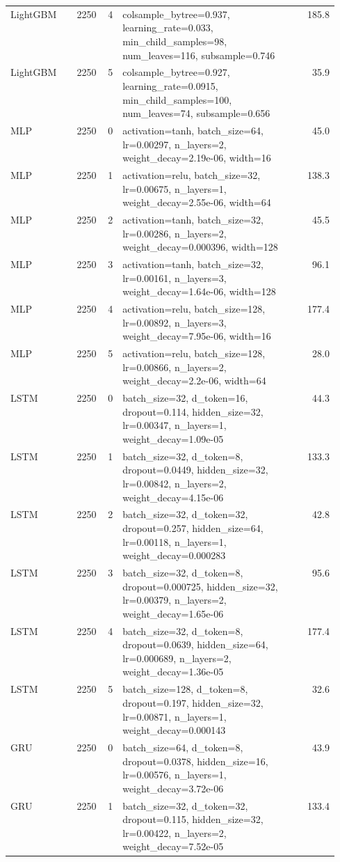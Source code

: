 \begin{longtable}{lrrp{0.55\linewidth}r}
LightGBM & 2250 & 4 & colsample\_bytree=0.937, learning\_rate=0.033, min\_child\_samples=98, num\_leaves=116, subsample=0.746 & 185.8 \\
LightGBM & 2250 & 5 & colsample\_bytree=0.927, learning\_rate=0.0915, min\_child\_samples=100, num\_leaves=74, subsample=0.656 & 35.9 \\
MLP & 2250 & 0 & activation=tanh, batch\_size=64, lr=0.00297, n\_layers=2, weight\_decay=2.19e-06, width=16 & 45.0 \\
MLP & 2250 & 1 & activation=relu, batch\_size=32, lr=0.00675, n\_layers=1, weight\_decay=2.55e-06, width=64 & 138.3 \\
MLP & 2250 & 2 & activation=tanh, batch\_size=32, lr=0.00286, n\_layers=2, weight\_decay=0.000396, width=128 & 45.5 \\
MLP & 2250 & 3 & activation=tanh, batch\_size=32, lr=0.00161, n\_layers=3, weight\_decay=1.64e-06, width=128 & 96.1 \\
MLP & 2250 & 4 & activation=relu, batch\_size=128, lr=0.00892, n\_layers=3, weight\_decay=7.95e-06, width=16 & 177.4 \\
MLP & 2250 & 5 & activation=relu, batch\_size=128, lr=0.00866, n\_layers=2, weight\_decay=2.2e-06, width=64 & 28.0 \\
LSTM & 2250 & 0 & batch\_size=32, d\_token=16, dropout=0.114, hidden\_size=32, lr=0.00347, n\_layers=1, weight\_decay=1.09e-05 & 44.3 \\
LSTM & 2250 & 1 & batch\_size=32, d\_token=8, dropout=0.0449, hidden\_size=32, lr=0.00842, n\_layers=2, weight\_decay=4.15e-06 & 133.3 \\
LSTM & 2250 & 2 & batch\_size=32, d\_token=32, dropout=0.257, hidden\_size=64, lr=0.00118, n\_layers=1, weight\_decay=0.000283 & 42.8 \\
LSTM & 2250 & 3 & batch\_size=32, d\_token=8, dropout=0.000725, hidden\_size=32, lr=0.00379, n\_layers=2, weight\_decay=1.65e-06 & 95.6 \\
LSTM & 2250 & 4 & batch\_size=32, d\_token=8, dropout=0.0639, hidden\_size=64, lr=0.000689, n\_layers=2, weight\_decay=1.36e-05 & 177.4 \\
LSTM & 2250 & 5 & batch\_size=128, d\_token=8, dropout=0.197, hidden\_size=32, lr=0.00871, n\_layers=1, weight\_decay=0.000143 & 32.6 \\
GRU & 2250 & 0 & batch\_size=64, d\_token=8, dropout=0.0378, hidden\_size=16, lr=0.00576, n\_layers=1, weight\_decay=3.72e-06 & 43.9 \\
GRU & 2250 & 1 & batch\_size=32, d\_token=32, dropout=0.115, hidden\_size=32, lr=0.00422, n\_layers=2, weight\_decay=7.52e-05 & 133.4 \\

\end{longtable}
